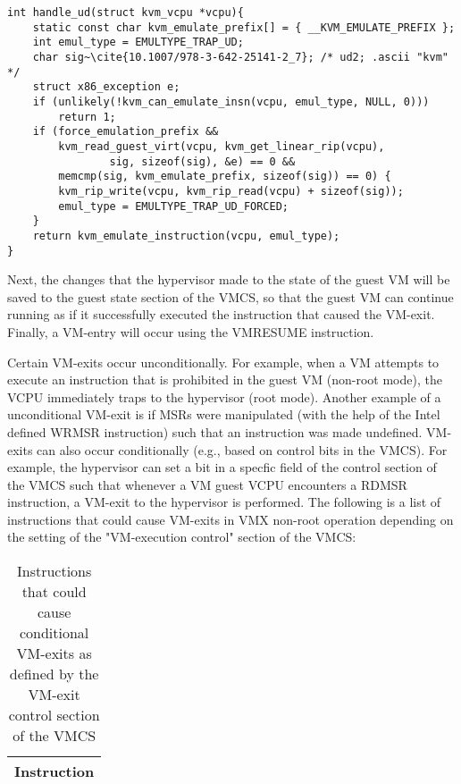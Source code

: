 \documentclass{report}
\begin{document}
\begin{spacing}{1.5}
{\begin{lstlisting}[caption={/arch/x86/kvm/x86.c:6959 | Linux kernel V5.18.8},captionpos=b]
int handle_ud(struct kvm_vcpu *vcpu){
    static const char kvm_emulate_prefix[] = { __KVM_EMULATE_PREFIX };
    int emul_type = EMULTYPE_TRAP_UD;
    char sig~\cite{10.1007/978-3-642-25141-2_7}; /* ud2; .ascii "kvm" */
    struct x86_exception e;
    if (unlikely(!kvm_can_emulate_insn(vcpu, emul_type, NULL, 0)))
        return 1;
    if (force_emulation_prefix &&
        kvm_read_guest_virt(vcpu, kvm_get_linear_rip(vcpu),
                sig, sizeof(sig), &e) == 0 &&
        memcmp(sig, kvm_emulate_prefix, sizeof(sig)) == 0) {
        kvm_rip_write(vcpu, kvm_rip_read(vcpu) + sizeof(sig));
        emul_type = EMULTYPE_TRAP_UD_FORCED;
    }
    return kvm_emulate_instruction(vcpu, emul_type);
}
\end{lstlisting}

Next, the changes that the hypervisor made to the state of the guest VM will be saved to the guest state section of the VMCS, so that the guest VM can continue running as if it successfully executed the instruction that caused the VM-exit. Finally, a VM-entry will occur using the VMRESUME instruction.
\newline
}

{\large
Certain VM-exits occur unconditionally. For example, when a VM attempts to execute an instruction that is prohibited in the guest VM (non-root mode), the VCPU immediately traps to the hypervisor (root mode). Another example of a unconditional VM-exit is if MSRs were manipulated (with the help of the Intel defined WRMSR instruction) such that an instruction was made undefined. VM-exits can also occur conditionally (e.g., based on control bits in the VMCS). For example, the hypervisor can set a bit in a specfic field of the control section of the VMCS such that whenever a VM guest VCPU encounters a RDMSR instruction, a VM-exit to the hypervisor is performed. The following is a list of instructions that could cause VM-exits in VMX non-root operation depending on the setting of the "VM-execution control" section of the VMCS: 
\leavevmode\newline


\begin{longtable}{|c|}
\caption{Instructions that could cause conditional VM-exits as defined by the VM-exit control section of the VMCS} \label{tab:long} \\

\hline \multicolumn{1}{|c|}{\textbf{Instruction}} \\ \hline 
\endfirsthead


\end{longtable}}
\end{spacing}
\end{document}
